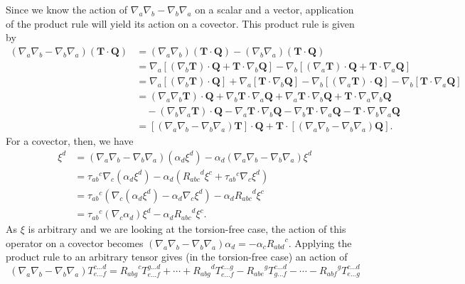 \documentclass[../the-road-to-reality.tex]{subfiles}
\begin{document}
\begin{questions}
	\begin{solution}
		Since we know the action of $\nabla_a\nabla_b - \nabla_b\nabla_a$ on a scalar and a vector, application of the product rule will yield its action on a covector. This product rule is given by
		\begin{align*}
			(\nabla_a\nabla_b - \nabla_b\nabla_a)(\mathbf{T}\cdot\mathbf{Q}) &= (\nabla_a\nabla_b)(\mathbf{T}\cdot\mathbf{Q}) - (\nabla_b\nabla_a)(\mathbf{T}\cdot\mathbf{Q}) \\
											 &= \nabla_a[(\nabla_b\mathbf{T})\cdot\mathbf{Q} + \mathbf{T}\cdot\nabla_b\mathbf{Q}] - \nabla_b[(\nabla_a\mathbf{T})\cdot\mathbf{Q} + \mathbf{T}\cdot\nabla_a\mathbf{Q}] \\
											 &= \nabla_a[(\nabla_b\mathbf{T})\cdot\mathbf{Q}] + \nabla_a[\mathbf{T}\cdot\nabla_b\mathbf{Q}] - \nabla_b[(\nabla_a\mathbf{T})\cdot\mathbf{Q}] - \nabla_b[\mathbf{T}\cdot\nabla_a\mathbf{Q}] \\
											 &= (\nabla_a\nabla_b\mathbf{T})\cdot\mathbf{Q} + \nabla_b\mathbf{T}\cdot\nabla_a\mathbf{Q} + \nabla_a\mathbf{T}\cdot\nabla_b\mathbf{Q} + \mathbf{T}\cdot\nabla_a\nabla_b\mathbf{Q} \\
											 &\quad-(\nabla_b\nabla_a\mathbf{T})\cdot\mathbf{Q} - \nabla_a\mathbf{T}\cdot\nabla_b\mathbf{Q} - \nabla_b\mathbf{T}\cdot\nabla_a\mathbf{Q} - \mathbf{T}\cdot\nabla_b\nabla_a\mathbf{Q} \\
											 &= [(\nabla_a\nabla_b - \nabla_b\nabla_a)\mathbf{T}]\cdot\mathbf{Q} + \mathbf{T}\cdot[(\nabla_a\nabla_b - \nabla_b\nabla_a)\mathbf{Q}]
		.\end{align*}
		For a covector, then, we have
		\begin{align*}
			[(\nabla_a\nabla_b - \nabla_b\nabla_a)\alpha_d]\xi^d &= (\nabla_a\nabla_b - \nabla_b\nabla_a)(\alpha_d\xi^d) - \alpha_d(\nabla_a\nabla_b - \nabla_b\nabla_a)\xi^d \\
									     &= {\tau_{ab}}^c\nabla_c(\alpha_d\xi^d) - \alpha_d({R_{abc}}^d\xi^c + {\tau_{ab}}^c\nabla_c\xi^d) \\
									     &= {\tau_{ab}}^c(\nabla_c(\alpha_d\xi^d)-\alpha_d\nabla_c\xi^d) - \alpha_d{R_{abc}}^d\xi^c \\
									     &= {\tau_{ab}}^c(\nabla_c\alpha_d)\xi^d - \alpha_d{R_{abc}}^d\xi^c
		.\end{align*}
  As $\xi$ is arbitrary and we are looking at the
  torsion-free case, the action of this operator on a covector becomes $(\nabla_a\nabla_b -
  \nabla_b\nabla_a)\alpha_d = -\alpha_c{R_{abd}}^c.$ Applying the product rule
  to an arbitrary tensor gives (in the torsion-free case) an action of
  \[
    (\nabla_a\nabla_b - \nabla_b\nabla_a)T^{c\dots{d}}_{e\dots{f}} =
    {R_{abg}}^cT^{g\dots{d}}_{e\dots{f}} + \cdots +
    {R_{abg}}^dT^{c\dots{g}}_{e\dots{f}} - {R_{abe}}^gT^{c\dots{d}}_{g\dots{f}}
    - \cdots - {R_{abf}}^gT^{c\dots{d}}_{e\dots{g}}
  \]
	\end{solution}


\end{questions}
\end{document}
